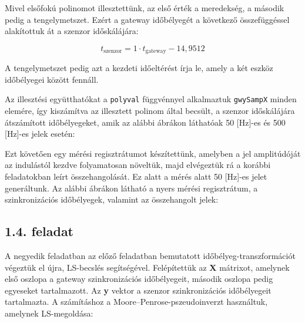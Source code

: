 \documentclass[12pt,a4paper]{article}
\newcommand{\feladat}[1]{%
\phantomsection
\subsection*{#1. feladat}%
\addcontentsline{toc}{subsection}{#1. feladat}%
}
\begin{document}
Mivel elsőfokú polinomot illesztettünk, az első érték a meredekség, a második pedig a tengelymetszet. Ezért a gateway időbélyegét a következő összefüggéssel alakítottuk át a szenzor időskálájára:

\begin{equation}
    t_{\mathrm{szenzor}} = 1 \cdot t_{\mathrm{gateway}} - 14{,}9512
\end{equation}

A tengelymetszet pedig azt a kezdeti időeltérést írja le, amely a két eszköz időbélyegei között fennáll.

Az illesztési együtthatókat a \texttt{polyval} függvénnyel alkalmaztuk \texttt{gwySampX} minden elemére, így kiszámítva az illesztett polinom által becsült, a szenzor időskálájára átszámított időbélyegeket, amik az alábbi ábrákon láthatóak 50 [Hz]-es és 500 [Hz]-es jelek esetén:



Ezt követően egy mérési regisztrátumot készítettünk, amelyben a jel amplitúdóját az indulástól kezdve folyamatosan növeltük, majd elvégeztük rá a korábbi feladatokban leírt összehangolását. Ez alatt a mérés alatt 50 [Hz]-es jelet generáltunk. Az alábbi ábrákon látható a nyers mérési regisztrátum, a szinkronizációs időbélyegek, valamint az összehangolt jelek:




\feladat{1.4}

A negyedik feladatban az előző feladatban bemutatott időbélyeg-transzformációt végeztük el újra, LS-becslés segítségével. Felépítettük az \textbf{X} mátrixot, amelynek első oszlopa a gateway szinkronizációs időbélyegeit, második oszlopa pedig egyeseket tartalmazott. Az \textbf{y} vektor a szenzor szinkronizációs időbélyegeit tartalmazta. A számításhoz a Moore--Penrose-pszeudoinverzt használtuk, amelynek LS-megoldása:
\end{document}
